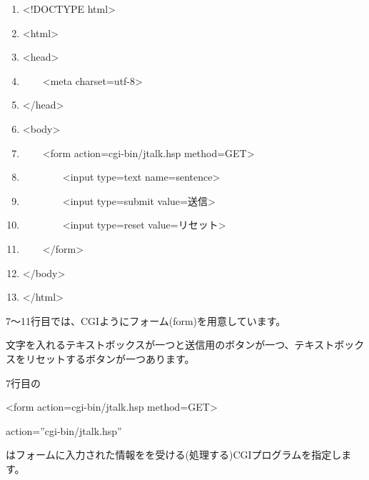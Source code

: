 \centering
\begin{boxedminipage}{16.148cm}
	\begin{enumerate}
	\baselineskip 10pt
	\setlength{\itemsep}{0cm}
	\item{\textless}!DOCTYPE html{\textgreater}
	\item{\textless}html{\textgreater}
	\item{\textless}head{\textgreater}
	\item\ \ \ \ {\textless}meta
	charset={\textquotedbl}utf-8{\textquotedbl}{\textgreater}
	\item{\textless}/head{\textgreater}
	\item{\textless}body{\textgreater}
	\item\ \ \ \ {\textless}form action={\textquotedbl}cgi-bin/jtalk.hsp{\textquotedbl}
	method={\textquotedbl}GET{\textquotedbl}{\textgreater}
	\item\ \ \ \ \ \ \ \ {\textless}input type={\textquotedbl}text{\textquotedbl}
	name={\textquotedbl}sentence{\textquotedbl}{\textgreater}
	\item\ \ \ \ \ \ \ \ {\textless}input type={\textquotedbl}submit{\textquotedbl}
	value={\textquotedbl}送信{\textquotedbl}{\textgreater}
	\item\ \ \ \ \ \ \ \ {\textless}input type={\textquotedbl}reset{\textquotedbl}
	value={\textquotedbl}リセット{\textquotedbl}{\textgreater}
	\item\ \ \ \ {\textless}/form{\textgreater}
	\item{\textless}/body{\textgreater}
	\item{\textless}/html{\textgreater}
	\end{enumerate}
\end{boxedminipage}
\flushleft

7〜11行目では、CGIようにフォーム(form)を用意しています。

文字を入れるテキストボックスが一つと送信用のボタンが一つ、テキストボックスをリセットするボタンが一つあります。

%

7行目の

{\textless}form action={\textquotedbl}cgi-bin/jtalk.hsp{\textquotedbl}
method={\textquotedbl}GET{\textquotedbl}{\textgreater}

action=”cgi-bin/jtalk.hsp”

はフォームに入力された情報をを受ける(処理する)CGIプログラムを指定します。

